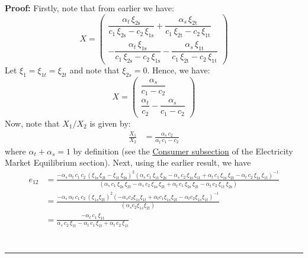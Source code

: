 \documentclass[11pt,a4paper,leqno]{extarticle}
\newenvironment{proof}[1][Proof]{\noindent\textbf{#1:} }{\ \rule{0.5em}{0.5em}}
\begin{document}
	
	
	\begin{proof}
		Firstly, note that from earlier we have:
		$$
		X = \begin{pmatrix}
		\dfrac{\alpha _{t}\,\xi _{\mathrm{2s}}}{c_{1}\,\xi _{\mathrm{2s}}-c_{2}\,\xi _{\mathrm{1s}}}+\dfrac{\alpha _{s}\,\xi _{\mathrm{2t}}}{c_{1}\,\xi _{\mathrm{2t}}-c_{2}\,\xi _{\mathrm{1t}}} \\[2ex] 
		-\dfrac{\alpha _{t}\,\xi _{\mathrm{1s}}}{c_{1}\,\xi _{\mathrm{2s}}-c_{2}\,\xi _{\mathrm{1s}}}-\dfrac{\alpha _{s}\,\xi _{\mathrm{1t}}}{c_{1}\,\xi _{\mathrm{2t}}-c_{2}\,\xi _{\mathrm{1t}}}
		\end{pmatrix}
		$$
		Let $\xi_1 = \xi_{1t} = \xi_{2t}$ and note that $\xi_{2s} = 0$. Hence, we have:
		$$
		X = \begin{pmatrix}
		\dfrac{\alpha_s}{c_1 - c_2} \\[2ex] 
		\dfrac{\alpha_t}{c_2} - \dfrac{\alpha_s}{c_1 - c_2}
		\end{pmatrix}
		$$
		Now, note that $X_1/X_2$ is given by:
		\begin{align*}
		\frac{X_1}{X_2} &= \frac{\alpha _{s}\,c_{2}}{\alpha _{t}\,c_{1} - c_2}
		\end{align*}
		where $\alpha_t + \alpha_s = 1$ by definition (see the \hyperref[sec:consumers]{Consumer subsection} of the Electricity Market Equilibrium section).  Next, using the earlier result, we have
		\begin{align*}
		e_{12} &= 
		\frac{-\alpha _{s}\,\alpha _{t}\,c_{1}\,c_{2}\,{\left(\xi _{\mathrm{1s}}\,\xi _{\mathrm{2t}}-\xi _{\mathrm{1t}}\,\xi _{\mathrm{2s}}\right)}^2 \left(\alpha _{s}\,c_{1}\,\xi _{\mathrm{1t}}\,\xi _{\mathrm{2s}}-\alpha _{s}\,c_{2}\,\xi _{\mathrm{1s}}\,\xi _{\mathrm{1t}}+\alpha _{t}\,c_{1}\,\xi _{\mathrm{1s}}\,\xi _{\mathrm{2t}}-\alpha _{t}\,c_{2}\,\xi _{\mathrm{1s}}\,\xi _{\mathrm{1t}}\right)^{-1}}{
			\,\left(\alpha _{s}\,c_{1}\,\xi _{\mathrm{2s}}\,\xi _{\mathrm{2t}}-\alpha _{s}\,c_{2}\,\xi _{\mathrm{1s}}\,\xi _{\mathrm{2t}}+\alpha _{t}\,c_{1}\,\xi _{\mathrm{2s}}\,\xi _{\mathrm{2t}}-\alpha _{t}\,c_{2}\,\xi _{\mathrm{1t}}\,\xi _{\mathrm{2s}}\right)
		}\\
		&= \frac{-\alpha_s \, \alpha_t \, c_1 \, c_2 \, (\xi_{1s} \xi_{2t})^2 ( -\alpha_s c_2 \xi_{1s} \xi_{1t} + \alpha_t c_1 \xi_{1s} \xi_{2t} - \alpha_t c_2 \xi_{1s} \xi_{1t})^{-1}}{
		( \alpha_s c_2 \xi_{1s} \xi_{2t})		
		} \\
		&= 
		\frac{-\alpha _{t}\,c_{1}\,\xi _{\mathrm{1t}}}{\alpha _{s}\,c_{2}\,\xi _{\mathrm{1t}}-\alpha _{t}\,c_{1}\,\xi _{\mathrm{1t}}+\alpha _{t}\,c_{2}\,\xi _{\mathrm{1t}}} \\

\end{align*}
\end{proof}
\end{document}
